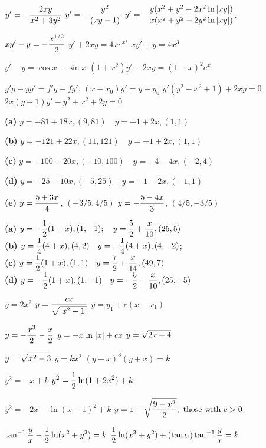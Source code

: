 \medskip

  $\displaystyle{y'=-\frac{2xy}{x^{2}+3y^{2}}}$
$y'=-\displaystyle\frac{y^{2}}{(xy-1)}$
$y'=-\displaystyle\frac{y(x^{2}+y^{2}-2x^{2}\ln|xy|)}{x(x^{2}+y^{2}-2y^{2}\ln|xy|)}$.

  $\displaystyle{xy'-y=-\frac{x^{1/2}}{2}}$
 $y'+2xy=4xe^{x^{2}}$
  $xy'+y=4x^{3}$

 $y'-y=\cos x-\sin x$
 $(1+x^{2})y'-2xy=(1-x)^{2}e^{x}$

 $y'g-yg'=f'g-fg'$.
 $(x-x_{0})y'=y-y_{0}$
  $y'(y^{2}-x^{2}+1)+2xy=0$
 $2x(y-1)y'-y^{2}+x^{2}+2y=0$

{\bf (a)} $y=-81+18x,(9,81)\quad y=-1+2x,(1,1)$

\quad\;  \;   {\bf (b) }$y=-121+22x,(11,121)\quad y=-1+2x,(1,1)$

\quad\;  \;   {\bf (c)} $y=-100-20x,(-10,100)\quad y=-4-4x,(-2,4)$

\quad\;  \;   {\bf (d)} $y=-25-10x,(-5,25)\quad y=-1-2x,(-1,1)$

{\bf (e)}
$y=\displaystyle\frac{5+3x}{4}$, $(-3/5,4/5)$
$y=-\displaystyle\frac{5-4x}{3}$, $(4/5,-3/5)$

{\bf (a)} $\displaystyle{y=-\frac{1}{2}(1+x),(1,-1);\quad y=
\frac{5}{2}+\frac{x}{10},(25,5)}$\\

\quad\;  \;  {\bf (b)} $\displaystyle{y=\frac{1}{4}(4+x),(4,2)\quad y
=-\frac{1}{4}(4+x),(4,-2)}$;\\

\quad\;  \;  {\bf (c)} $\displaystyle{y=\frac{1}{2}(1+x),(1,1)\quad y=
\frac{7}{2}+\frac{x}{14},(49,7)}$\\

\quad\;  \;  {\bf (d)} $\displaystyle{y=-\frac{1}{2}(1+x),(1,-1)\quad y=
-\frac{5}{2}-\frac{x}{10},(25,-5)}$

  $y=2x^{2}$
  $\displaystyle{y=\frac{cx}{\sqrt{|x^{2}-1|}}}$
  $y=y_{1}+c(x-x_{1})$

  $\displaystyle{y=-\frac{x^{3}}{2}-\frac{x}{2}}$
  $y=-x\ln|x|+cx$
  $\displaystyle{y=\sqrt{2x+4}}$

 $\displaystyle{y=\sqrt{x^{2}-3}}$
  $y=kx^{2}$
 $(y-x)^{3}(y+x)=k$

 $y^{2}=-x+k$
 $\displaystyle{y^{2}=\frac{1}{2}\ln(1+2x^{2})+k}$

  $y^{2}=-2x-\ln(x-1)^{2}+k$
 $\displaystyle{y=1+{\sqrt{\frac{9-x^{2}}{2}}};\mbox{ those with }c>0}$

 $\displaystyle{\tan^{-1}\frac{y}{x}-\frac{1}{2}\ln(x^{2}+y^{2})=k}$
$\displaystyle{\frac{1}{2}\ln(x^{2}+y^{2})+(\tan\alpha)\tan^{-1}\frac{y}{x}=k}$

